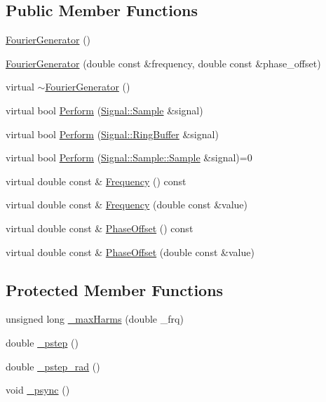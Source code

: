 \subsection*{Public Member Functions}
\begin{DoxyCompactItemize}
\item 
\hyperlink{classDSG_1_1Fourier_1_1FourierGenerator_a42dcd55b71953c2eb21d6319f4a050a1}{Fourier\-Generator} ()
\item 
\hyperlink{classDSG_1_1Fourier_1_1FourierGenerator_a6e8f9886917cd93a1fe43ec023d5b1be}{Fourier\-Generator} (double const \&frequency, double const \&phase\-\_\-offset)
\item 
virtual \hyperlink{classDSG_1_1Fourier_1_1FourierGenerator_ab34217565a44ca0663f295975021f798}{$\sim$\-Fourier\-Generator} ()
\item 
virtual bool \hyperlink{classDSG_1_1Fourier_1_1FourierGenerator_a23b7bfee098b103c3c62f277229e2bb9}{Perform} (\hyperlink{classDSG_1_1Signal_1_1Sample}{Signal\-::\-Sample} \&signal)
\item 
virtual bool \hyperlink{classDSG_1_1Fourier_1_1FourierGenerator_abb57d65b6e7a8bf07c8e11a5fc84914f}{Perform} (\hyperlink{classDSG_1_1Signal_1_1RingBuffer}{Signal\-::\-Ring\-Buffer} \&signal)
\item 
virtual bool \hyperlink{classDSG_1_1SignalProcess_ae8a803d175eca1ec5f34a52035a082b4}{Perform} (\hyperlink{classDSG_1_1Signal_1_1Sample_a21db6fade3ee3554ed3887cb2b74daff}{Signal\-::\-Sample\-::\-Sample} \&signal)=0
\item 
virtual double const \& \hyperlink{classDSG_1_1SignalGenerator_aedac746c5a70818d120858542ecb7c45}{Frequency} () const 
\item 
virtual double const \& \hyperlink{classDSG_1_1SignalGenerator_ae3ce8d45bafabbd86a0f535b15c3cd46}{Frequency} (double const \&value)
\item 
virtual double const \& \hyperlink{classDSG_1_1SignalGenerator_a1ce521847edd0b837fd840998f906b4b}{Phase\-Offset} () const 
\item 
virtual double const \& \hyperlink{classDSG_1_1SignalGenerator_a08b71b1f30ba65e629642c570291dc0e}{Phase\-Offset} (double const \&value)
\end{DoxyCompactItemize}
\subsection*{Protected Member Functions}
\begin{DoxyCompactItemize}
\item 
unsigned long \hyperlink{classDSG_1_1Fourier_1_1FourierGenerator_a38d0cc3f7f26e89379626627c17ae33a}{\-\_\-max\-Harms} (double \-\_\-frq)
\item 
double \hyperlink{classDSG_1_1SignalGenerator_ac0d781b8673b3a283bf7c133290ede50}{\-\_\-pstep} ()
\item 
double \hyperlink{classDSG_1_1SignalGenerator_ae660eb4caa88b8d278f8d24d0908a487}{\-\_\-pstep\-\_\-rad} ()
\item 
void \hyperlink{classDSG_1_1SignalGenerator_a05baccb38d1e52860d4fcf7cb8430efc}{\-\_\-psync} ()
\end{DoxyCompactItemize}
